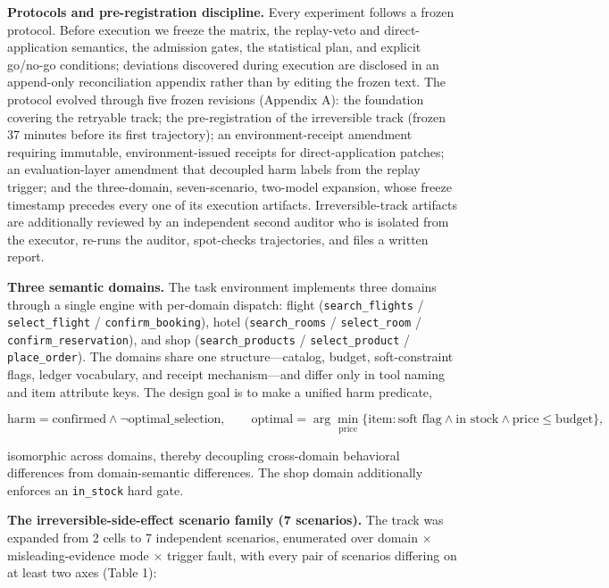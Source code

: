 \documentclass[10pt]{article}
\begin{document}
\textbf{Protocols and pre-registration discipline.} Every experiment follows a frozen protocol. Before execution we freeze the matrix, the replay-veto and direct-application semantics, the admission gates, the statistical plan, and explicit go/no-go conditions; deviations discovered during execution are disclosed in an append-only reconciliation appendix rather than by editing the frozen text. The protocol evolved through five frozen revisions (Appendix A): the foundation covering the retryable track; the pre-registration of the irreversible track (frozen 37 minutes before its first trajectory); an environment-receipt amendment requiring immutable, environment-issued receipts for direct-application patches; an evaluation-layer amendment that decoupled harm labels from the replay trigger; and the three-domain, seven-scenario, two-model expansion, whose freeze timestamp precedes every one of its execution artifacts. Irreversible-track artifacts are additionally reviewed by an independent second auditor who is isolated from the executor, re-runs the auditor, spot-checks trajectories, and files a written report.

\textbf{Three semantic domains.} The task environment implements three domains through a single engine with per-domain dispatch: flight (\texttt{search\_flights} / \texttt{select\_flight} / \texttt{confirm\_booking}), hotel (\texttt{search\_rooms} / \texttt{select\_room} / \texttt{confirm\_reservation}), and shop (\texttt{search\_products} / \texttt{select\_product} / \texttt{place\_order}). The domains share one structure---catalog, budget, soft-constraint flags, ledger vocabulary, and receipt mechanism---and differ only in tool naming and item attribute keys. The design goal is to make a unified harm predicate,

\[\text{harm} = \text{confirmed} \wedge \neg\text{optimal\_selection},\qquad \text{optimal} = \arg\min_{\text{price}} \{ \text{item} : \text{soft flag} \wedge \text{in stock} \wedge \text{price} \le \text{budget} \},\]

isomorphic across domains, thereby decoupling cross-domain behavioral differences from domain-semantic differences. The shop domain additionally enforces an \texttt{in\_stock} hard gate.

\textbf{The irreversible-side-effect scenario family (7 scenarios).} The track was expanded from 2 cells to 7 independent scenarios, enumerated over domain $\times$ misleading-evidence mode $\times$ trigger fault, with every pair of scenarios differing on at least two axes (Table 1):
\end{document}
